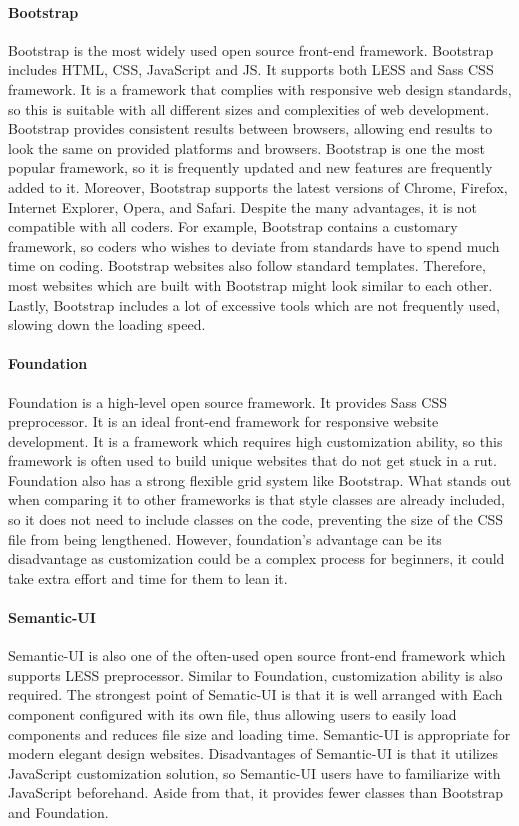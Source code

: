 \documentclass[10pt]{article}
\begin{document}
        
            \paragraph{Bootstrap}
                Bootstrap is the most widely used open source front-end framework. Bootstrap includes HTML, CSS, JavaScript and JS. It supports both LESS and Sass CSS framework. It is a framework that complies with responsive web design standards, so this is suitable with all different sizes and complexities of web development. Bootstrap provides consistent results between browsers, allowing end results to look the same on provided platforms and browsers. Bootstrap is one the most popular framework, so it is frequently updated and new features are frequently added to it. Moreover, Bootstrap supports the latest versions of Chrome, Firefox, Internet Explorer, Opera, and Safari. Despite the many advantages, it is not compatible with all coders. For example, Bootstrap contains a customary framework, so coders who wishes to deviate from standards have to spend much time on coding. Bootstrap websites also follow standard templates. Therefore, most websites which are built with Bootstrap might look similar to each other. Lastly, Bootstrap includes a lot of excessive tools which are not frequently used, slowing down the loading speed. 
                
            \paragraph{Foundation}
                Foundation is a high-level open source framework. It provides Sass CSS preprocessor. It is an ideal front-end framework for responsive website development. It is a framework which requires high customization ability, so this framework is often used to build unique websites that do not get stuck in a rut. Foundation also has a strong flexible grid system like Bootstrap. What stands out when comparing it to other frameworks is that style classes are already included, so it does not need to include classes on the code, preventing the size of the CSS file from being lengthened. However, foundation’s advantage can be its disadvantage as customization could be a complex process for beginners, it could take extra effort and time for them to lean it. 
         
            \paragraph{Semantic-UI}
                Semantic-UI is also one of the often-used open source front-end framework which supports LESS preprocessor. Similar to Foundation, customization ability is also required. The strongest point of Sematic-UI is that it is well arranged with Each component configured with its own file, thus allowing users to easily load components and reduces file size and loading time. Semantic-UI is appropriate for modern elegant design websites. Disadvantages of Semantic-UI is that it utilizes JavaScript customization solution, so Semantic-UI users have to familiarize with JavaScript beforehand. Aside from that, it provides fewer classes than Bootstrap and Foundation. 
        
\end{document}
